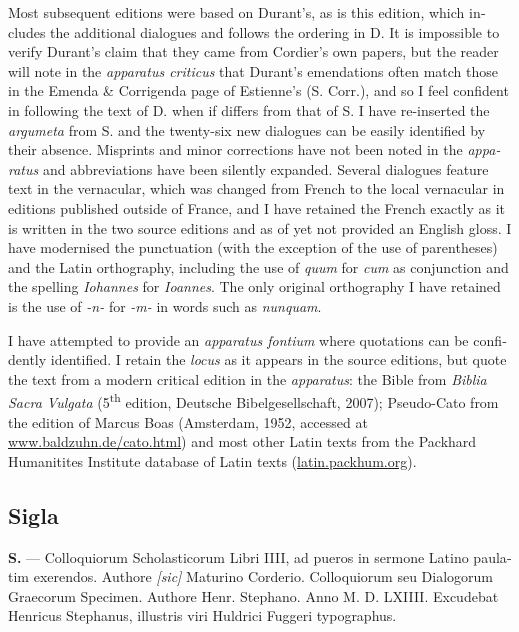\documentclass{article}
\begin{document}
\begin{english}
Most subsequent editions were based on Durant's, as is this edition, which includes the additional dialogues and follows the ordering in D. It is impossible to verify Durant's claim that they came from Cordier's own papers, but the reader will note in the \emph{apparatus criticus} that Durant's emendations often match those in the Emenda \& Corrigenda page of Estienne's (S. Corr.), and so I feel confident in following the text of D. when if differs from that of S. I have re-inserted the \emph{argumeta} from S. and the twenty-six new dialogues can be easily identified by their absence. Misprints and minor corrections have not been noted in the \emph{apparatus} and abbreviations have been silently expanded. Several dialogues feature text in the vernacular, which was changed from French to the local vernacular in editions published outside of France, and I have retained the French exactly as it is written in the two source editions and as of yet not provided an English gloss. I have modernised the punctuation (with the exception of the use of parentheses) and the Latin orthography, including the use of \emph{quum} for \emph{cum} as conjunction and the spelling \emph{Iohannes} for \emph{Ioannes}. The only original orthography I have retained is the use of \emph{-n-} for \emph{-m-} in words such as \emph{nunquam}.

I have attempted to provide an \emph{apparatus fontium} where quotations can be confidently identified. I retain the \emph{locus} as it appears in the source editions, but quote the text from a modern critical edition in the \emph{apparatus}: the Bible from \emph{Biblia Sacra Vulgata} (5\textsuperscript{th} edition, Deutsche Bibelgesellschaft, 2007); Pseudo-Cato from the edition of Marcus Boas (Amsterdam, 1952, accessed at \url{www.baldzuhn.de/cato.html}) and most other Latin texts from the Packhard Humanitites Institute database of Latin texts (\url{latin.packhum.org}).

\subsection*{Sigla}
\begin{description}
\item \textbf{S.} --- Colloquiorum Scholasticorum Libri IIII, ad pueros in sermone Latino paulatim exerendos. Authore \emph{[sic]} Maturino Corderio. Colloquiorum seu Dialogorum Graecorum Specimen. Authore Henr. Stephano. Anno M. D. LXIIII. Excudebat Henricus Stephanus, illustris viri Huldrici Fuggeri typographus.


\end{description}
\end{english}
\end{document}
